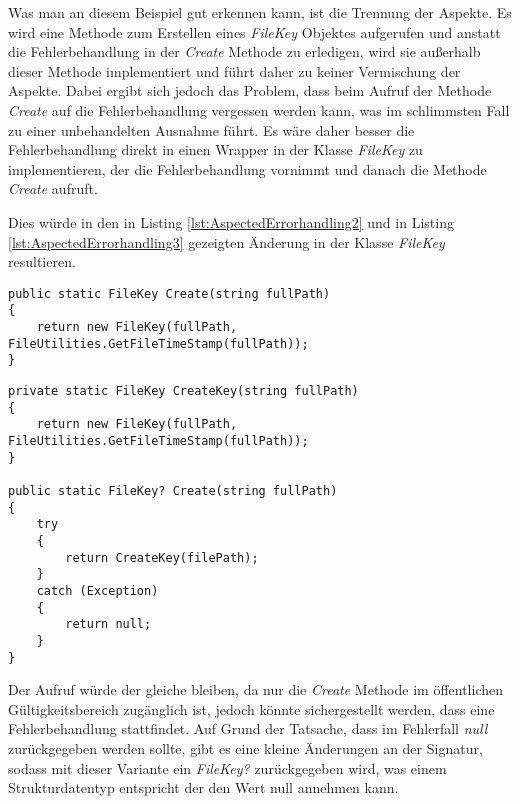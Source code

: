 \SuperPar Was man an diesem Beispiel gut erkennen kann, ist die Trennung der Aspekte. Es wird eine Methode zum Erstellen eines \textit{FileKey} Objektes aufgerufen und anstatt die Fehlerbehandlung in der \textit{Create} Methode zu erledigen, wird sie außerhalb dieser Methode implementiert und führt daher zu keiner Vermischung der Aspekte. Dabei ergibt sich jedoch das Problem, dass beim Aufruf der Methode \textit{Create} auf die Fehlerbehandlung vergessen werden kann, was im schlimmsten Fall zu einer unbehandelten Ausnahme führt. Es wäre daher besser die Fehlerbehandlung direkt in einen Wrapper in der Klasse \textit{FileKey} zu implementieren, der die Fehlerbehandlung vornimmt und danach die Methode \textit{Create} aufruft.

\SuperPar Dies würde in den in Listing \ref{lst:AspectedErrorhandling2} und in Listing \ref{lst:AspectedErrorhandling3} gezeigten Änderung in der Klasse \textit{FileKey} resultieren.

\begin{lstlisting}[language={[Sharp]C}, caption=Fehlerbehandlung in der Klasse FileKey vorher, label=lst:AspectedErrorhandling2]
public static FileKey Create(string fullPath)
{
	return new FileKey(fullPath, FileUtilities.GetFileTimeStamp(fullPath));
}
\end{lstlisting}

\begin{lstlisting}[language={[Sharp]C}, caption=Fehlerbehandlung in der Klasse FileKey nachher, label=lst:AspectedErrorhandling3]
private static FileKey CreateKey(string fullPath)
{
	return new FileKey(fullPath, FileUtilities.GetFileTimeStamp(fullPath));
}
				
public static FileKey? Create(string fullPath)
{
	try
	{
		return CreateKey(filePath);
	}
	catch (Exception)
	{
		return null;
	}
}
\end{lstlisting}

\SuperPar Der Aufruf würde der gleiche bleiben, da nur die \textit{Create} Methode im öffentlichen Gültigkeitsbereich zugänglich ist, jedoch könnte sichergestellt werden, dass eine Fehlerbehandlung stattfindet. Auf Grund der Tatsache, dass im Fehlerfall \textit{null} zurückgegeben werden sollte, gibt es eine kleine Änderungen an der Signatur, sodass mit dieser Variante ein \textit{FileKey?} zurückgegeben wird, was einem Strukturdatentyp entspricht der den Wert null annehmen kann. 

